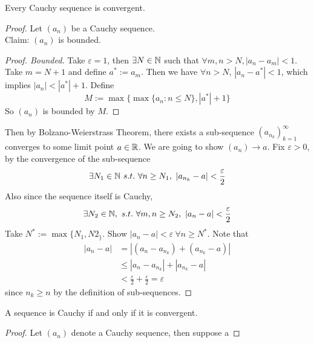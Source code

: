 \documentclass[11pt]{article}
\begin{document}
        \begin{theorem}
            Every Cauchy sequence is convergent.
        \end{theorem}
        
        \begin{proof}
            Let $(a_n)$ be a Cauchy sequence. \\
            Claim: $(a_n)$ is bounded.
            \begin{proof}[Proof. Bounded]
                Take $\varepsilon=1$, then $\exists N \in \mathbb{N}$ such that $\forall m, n > N, |a_n - a_m| < 1$. Take $m = N+1$ and define $a^* := a_m$. Then we have $\forall n > N$, $|a_n - a^*| < 1$, which implies $|a_n| < |a^*| + 1$. Define 
                \begin{equation}
                    M := \max\{
                        \max\{a_n: n \leq N\}, |a^*| + 1
                    \}
                \end{equation}
                So $(a_n)$ is bounded by $M$.
            \end{proof}
            Then by Bolzano-Weierstrass Theorem, there exists a sub-sequence $(a_{n_k})_{k=1}^\infty$ converges to some limit point $a \in \mathbb{R}$. We are going to show $(a_n) \to a$. Fix $\varepsilon>0$, by the convergence of the sub-sequence
            \begin{equation}
                \exists N_1 \in \N\ s.t.\ \forall n \geq N_1,\ |a_{n_k} - a| < \frac{\varepsilon}{2}
            \end{equation}
            Also since the sequence itself is Cauchy,
            \begin{equation}
                \exists N_2 \in \mathbb{N},\ s.t.\ \forall m, n \geq N_2,\ |a_n - a| < \frac{\varepsilon}{2}
            \end{equation}
            Take $N^* := \max\{N_1, N2_\}$. Show $|a_n - a| < \varepsilon\ \forall n \geq N^*$. Note that 
            \begin{align}
                |a_n - a| &= |(a_n - a_{n_k}) + (a_{n_k} - a)| \\
                &\leq |a_n - a_{n_k}| + |a_{n_k} - a| \\
                &<\frac{\varepsilon}{2} + \frac{\varepsilon}{2} = \varepsilon
            \end{align}
            since $n_k \geq n$ by the definition of sub-sequences.
        \end{proof}
    
        \begin{corollary}
            A sequence is Cauchy if and only if it is convergent.
        \end{corollary}
        
        \begin{proof}
            Let $(a_n)$ denote a Cauchy sequence, then suppose a 
        \end{proof}
\end{document}
